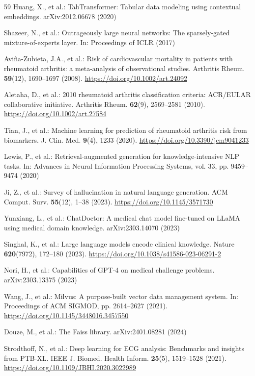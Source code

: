 \documentclass[AMA,STIX1COL,]{WileyNJD-v2}
\begin{document}
\begin{thebibliography}{59}
Huang, X., et al.: TabTransformer: Tabular data modeling using contextual embeddings. arXiv:2012.06678 (2020)

Shazeer, N., et al.: Outrageously large neural networks: The sparsely-gated mixture-of-experts layer. In: Proceedings of ICLR (2017)

Avi\~na-Zubieta, J.A., et al.: Risk of cardiovascular mortality in patients with rheumatoid arthritis: a meta-analysis of observational studies. Arthritis Rheum. \textbf{59}(12), 1690--1697 (2008). \url{https://doi.org/10.1002/art.24092}

Aletaha, D., et al.: 2010 rheumatoid arthritis classification criteria: ACR/EULAR collaborative initiative. Arthritis Rheum. \textbf{62}(9), 2569--2581 (2010). \url{https://doi.org/10.1002/art.27584}

Tian, J., et al.: Machine learning for prediction of rheumatoid arthritis risk from biomarkers. J. Clin. Med. \textbf{9}(4), 1233 (2020). \url{https://doi.org/10.3390/jcm9041233}

Lewis, P., et al.: Retrieval-augmented generation for knowledge-intensive NLP tasks. In: Advances in Neural Information Processing Systems, vol. 33, pp. 9459--9474 (2020)

Ji, Z., et al.: Survey of hallucination in natural language generation. ACM Comput. Surv. \textbf{55}(12), 1--38 (2023). \url{https://doi.org/10.1145/3571730}

Yunxiang, L., et al.: ChatDoctor: A medical chat model fine-tuned on LLaMA using medical domain knowledge. arXiv:2303.14070 (2023)

Singhal, K., et al.: Large language models encode clinical knowledge. Nature \textbf{620}(7972), 172--180 (2023). \url{https://doi.org/10.1038/s41586-023-06291-2}

Nori, H., et al.: Capabilities of GPT-4 on medical challenge problems. arXiv:2303.13375 (2023)

Wang, J., et al.: Milvus: A purpose-built vector data management system. In: Proceedings of ACM SIGMOD, pp. 2614--2627 (2021). \url{https://doi.org/10.1145/3448016.3457550}

Douze, M., et al.: The Faiss library. arXiv:2401.08281 (2024)

Strodthoff, N., et al.: Deep learning for ECG analysis: Benchmarks and insights from PTB-XL. IEEE J. Biomed. Health Inform. \textbf{25}(5), 1519--1528 (2021). \url{https://doi.org/10.1109/JBHI.2020.3022989}


\end{thebibliography}
\end{document}
